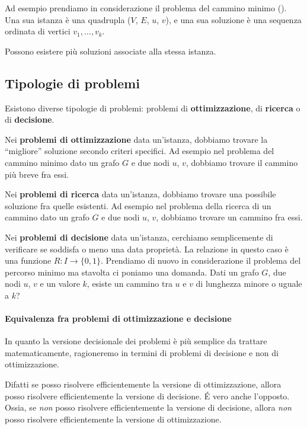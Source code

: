 Ad esempio prendiamo in considerazione il problema del cammino minimo (\shortestPath).
Una sua istanza è una quadrupla (\(V\), \(E\), \(u\), \(v\)), e una sua soluzione è una sequenza ordinata di vertici \(v_1, \dots, v_k\).

\begin{note}
Possono esistere più soluzioni associate alla stessa istanza.
\end{note}

\subsection*{Tipologie di problemi}

Esistono diverse tipologie di problemi: problemi di \textbf{ottimizzazione}, di \textbf{ricerca} o di \textbf{decisione}.

Nei \textbf{problemi di ottimizzazione} data un'istanza, dobbiamo trovare la \enquote{migliore} soluzione secondo criteri specifici.
Ad esempio nel problema del cammino minimo dato un grafo \(G\) e due nodi \(u\), \(v\), dobbiamo trovare il cammino più breve fra essi.

Nei \textbf{problemi di ricerca} data un'istanza, dobbiamo trovare una possibile soluzione fra quelle esistenti.
Ad esempio nel problema della ricerca di un cammino dato un grafo \(G\) e due nodi \(u\), \(v\), dobbiamo trovare un cammino fra essi.

Nei \textbf{problemi di decisione} data un'istanza, cerchiamo semplicemente di verificare se soddisfa o meno una data proprietà.
La relazione in questo caso è una funzione \(R: I \to \{0,1\}\).
Prendiamo di nuovo in considerazione il problema del percorso minimo ma stavolta ci poniamo una domanda.
Dati un grafo \(G\), due nodi \(u\), \(v\) e un valore \(k\), esiste un cammino tra \(u\) e \(v\) di lunghezza minore o uguale a \(k\)?

\paragraph{Equivalenza fra problemi di ottimizzazione e decisione}
In quanto la versione decisionale dei problemi è più semplice da trattare matematicamente, ragioneremo in termini di problemi di decisione e non di ottimizzazione.

Difatti se posso risolvere efficientemente la versione di ottimizzazione, allora posso risolvere efficientemente la versione di decisione.
\'{E} vero anche l'opposto.
Ossia, se \emph{non} posso risolvere efficientemente la versione di decisione, allora \emph{non} posso risolvere efficientemente la versione di ottimizzazione.

